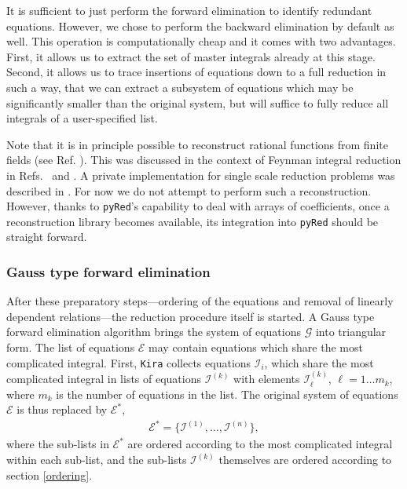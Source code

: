 \documentclass[a4paper,12pt]{scrartcl}
\newcommand*{\kira}{\texttt{Kira}}
\newcommand*{\pyred}{\texttt{pyRed}}
\newcommand*{\CE}{\mathcal{E}}
\newcommand*{\CG}{\mathcal{G}}
\newcommand*{\CI}{\mathcal{I}}
\begin{document}
It is sufficient to just perform the forward elimination to identify redundant
equations. However, we chose to perform the backward elimination by default as
well. 
This operation is computationally cheap and it comes with two advantages. First,
it allows us to extract the set of master integrals already at this stage.
Second, it allows us to trace insertions of equations down to a full reduction
in such a way, that we can extract a subsystem of equations which may be
significantly smaller than the original system, but will suffice to fully reduce
all integrals of a user-specified list.

Note that it is in principle possible to reconstruct rational
functions from finite fields (see Ref. \cite{Kauers:2008zz}). This was
discussed in the context of Feynman integral reduction in
Refs.~\cite{vonManteuffel:2014ixa} and \cite{Peraro:2016wsq}.  
A private implementation for single scale
reduction problems was described in \cite{vonManteuffel:2016xki}. For
now we do not attempt to perform such a reconstruction. However,
thanks to \pyred{}'s capability to deal with arrays of coefficients,
once a reconstruction library becomes available, its integration into
\pyred{} should be straight forward.

\subsubsection{Gauss type forward elimination}
\label{forward-elimination}
After these preparatory steps---ordering of the equations and removal of
linearly dependent relations---the reduction procedure itself is started. A
Gauss type forward elimination algorithm brings the system of equations $\CG$
into triangular form. The list of equations $\CE$ may contain equations which
share the most complicated integral. First, \kira{} collects equations $\CI_i$,
which share the most complicated integral in lists of equations $\CI^{(k)}$ with
elements $\CI^{(k)}_\ell$, $\ell=1\dots m_k$, where $m_k$ is the number of
equations in the list. The original system of equations $\CE$ is thus replaced
by $\CE^*$,
\begin{align}
  \CE^* = \{\CI^{(1)},\dots, \CI^{(n)}\},
  \label{systemofsublists}
\end{align}
where the sub-lists in $\CE^*$ are ordered according to the most complicated
integral within each sub-list, and the sub-lists $\CI^{(k)}$ themselves are
ordered according to section \ref{ordering}.
\end{document}
